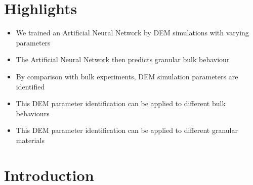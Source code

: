 \documentclass[review]{elsarticle}
\begin{document}

\section{Highlights}
\label{sec:highlights}
\begin{itemize}
  \item{We trained an Artificial Neural Network by DEM simulations with varying
  parameters}
  \item{The Artificial Neural Network then predicts granular bulk behaviour}
  \item{By comparison with bulk experiments, DEM simulation parameters are
  identified}
  \item{This DEM parameter identification can be applied to different bulk
  behaviours}
  \item{This DEM parameter identification can be applied to different granular
  materials}
\end{itemize}

\section{Introduction}
\label{sec:introduction}
\end{document}
